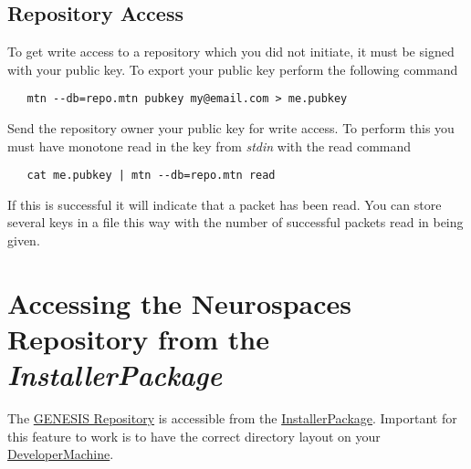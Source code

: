 \documentclass[12pt]{article}
\begin{document}
\subsection*{Repository Access}

To get write access to a repository which you did not initiate, it must be signed with your public key. To export your public key perform the following command
\begin{verbatim}
   mtn --db=repo.mtn pubkey my@email.com > me.pubkey 
\end{verbatim}
Send the repository owner your public key for write access. To perform this you must have monotone read in the key from {\it stdin} with the read command
\begin{verbatim}
   cat me.pubkey | mtn --db=repo.mtn read 
\end{verbatim}
If this is successful it will indicate that a packet has been read. You can store several keys in a file this way with the number of successful packets read in being given. 

\section*{Accessing the Neurospaces Repository from the {\it InstallerPackage}}

The \href{../genesis-repository/genesis-repository.tex}{GENESIS Repository} is accessible from the \href{../installerpackage/installerpackage.tex}{InstallerPackage}. Important for this feature to work is to have the correct directory layout on your \href{../developer-machine/developer-machine.tex}{DeveloperMachine}.
\end{document}
